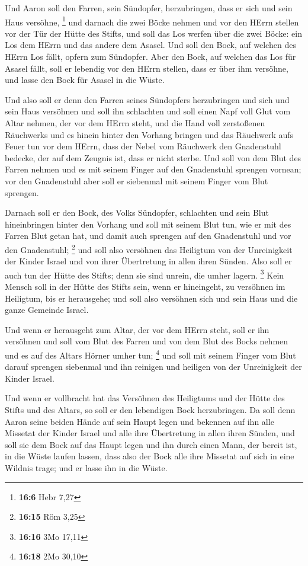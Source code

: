  Und Aaron soll den Farren, sein Sündopfer, herzubringen,
dass er sich und sein Haus versöhne, \footnote{\textbf{16:6} Hebr 7,27}
 und darnach die zwei Böcke nehmen und vor den HErrn stellen
vor der Tür der Hütte des Stifts,  und soll das Los werfen
über die zwei Böcke: ein Los dem HErrn und das andere dem Asasel.
 Und soll den Bock, auf welchen des HErrn Los fällt, opfern
zum Sündopfer.  Aber den Bock, auf welchen das Los für
Asasel fällt, soll er lebendig vor den HErrn stellen, dass er über ihm
versöhne, und lasse den Bock für Asasel in die Wüste.

 Und also soll er denn den Farren seines Sündopfers
herzubringen und sich und sein Haus versöhnen und soll ihn schlachten
 und soll einen Napf voll Glut vom Altar nehmen, der vor
dem HErrn steht, und die Hand voll zerstoßenen Räuchwerks und es hinein
hinter den Vorhang bringen  und das Räuchwerk aufs Feuer
tun vor dem HErrn, dass der Nebel vom Räuchwerk den Gnadenstuhl bedecke,
der auf dem Zeugnis ist, dass er nicht sterbe.  Und soll
von dem Blut des Farren nehmen und es mit seinem Finger auf den
Gnadenstuhl sprengen vornean; vor den Gnadenstuhl aber soll er siebenmal
mit seinem Finger vom Blut sprengen.

 Darnach soll er den Bock, des Volks Sündopfer, schlachten
und sein Blut hineinbringen hinter den Vorhang und soll mit seinem Blut
tun, wie er mit des Farren Blut getan hat, und damit auch sprengen auf
den Gnadenstuhl und vor den Gnadenstuhl; \footnote{\textbf{16:15} Röm
  3,25}  und soll also versöhnen das Heiligtum von der
Unreinigkeit der Kinder Israel und von ihrer Übertretung in allen ihren
Sünden. Also soll er auch tun der Hütte des Stifts; denn sie sind
unrein, die umher lagern. \footnote{\textbf{16:16} 3Mo 17,11}
 Kein Mensch soll in der Hütte des Stifts sein, wenn er
hineingeht, zu versöhnen im Heiligtum, bis er herausgehe; und soll also
versöhnen sich und sein Haus und die ganze Gemeinde Israel.

 Und wenn er herausgeht zum Altar, der vor dem HErrn steht,
soll er ihn versöhnen und soll vom Blut des Farren und von dem Blut des
Bocks nehmen und es auf des Altars Hörner umher tun; \footnote{\textbf{16:18}
  2Mo 30,10}  und soll mit seinem Finger vom Blut darauf
sprengen siebenmal und ihn reinigen und heiligen von der Unreinigkeit
der Kinder Israel.

 Und wenn er vollbracht hat das Versöhnen des Heiligtums
und der Hütte des Stifts und des Altars, so soll er den lebendigen Bock
herzubringen.  Da soll denn Aaron seine beiden Hände auf
sein Haupt legen und bekennen auf ihn alle Missetat der Kinder Israel
und alle ihre Übertretung in allen ihren Sünden, und soll sie dem Bock
auf das Haupt legen und ihn durch einen Mann, der bereit ist, in die
Wüste laufen lassen,  dass also der Bock alle ihre Missetat
auf sich in eine Wildnis trage; und er lasse ihn in die Wüste.

